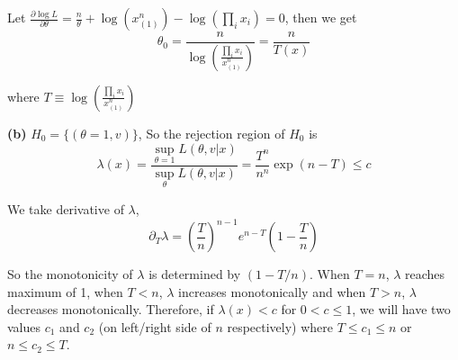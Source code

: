 \documentclass[12pt]{article}
\begin{document}
Let $\frac{\partial \log L}{\partial \theta} = \frac{n}{\theta} + \log(x_{(1)}^n) - \log(\prod_i x_i) = 0$, then we get $$\theta_0 = \frac{n}{\log \left( \frac{ \prod_i x_i}{x_{(1)}^n}\right)} = \frac{n}{T(x)}$$

where $T \equiv  \log \left( \frac{ \prod_i x_i}{x_{(1)}^n}\right)$

\textbf{(b)} $H_0 = \{(\theta = 1, v)\}$,
So the rejection region of $H_0$ is $$\lambda(x) = \frac{\sup_{\theta=1} L(\theta, v| x)}{\sup_{\theta} L(\theta, v | x)} = \frac{T^n}{n^n}\exp(n - T) \leq c$$ 

We take derivative of $\lambda$,  $$\partial_{T}\lambda = \left(\frac{T}{n}\right)^{n-1} e^{n-T} \left( 1- \frac{T}{n} \right)$$ 

So the monotonicity of $\lambda$ is determined by $(1 - T/n)$. When $T = n$, $\lambda$ reaches maximum of 1, when $T < n$, $\lambda$ increases monotonically and when $T > n$, $\lambda$ decreases monotonically. Therefore, if $\lambda(x) < c$ for $0 < c \leq 1$, we will have two values $c_1$ and $c_2$ (on left/right side of $n$ respectively) where $T \leq c_1 \leq n$ or $n \leq c_2 \leq T$.
\end{document}
